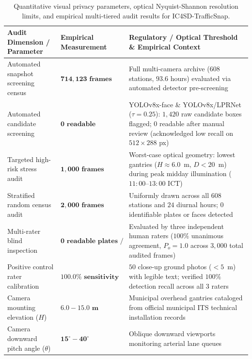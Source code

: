 \begin{table}[!htbp]
\centering
\scriptsize
\setlength{\tabcolsep}{4pt}
\renewcommand{\arraystretch}{1.08}
\caption{Quantitative visual privacy parameters, optical Nyquist-Shannon resolution limits, and empirical multi-tiered audit results for IC4SD-TrafficSnap.}
\label{tab:pii_audit}
\begin{tabularx}{\textwidth}{@{} >{\raggedright\arraybackslash}p{5.2cm} >{\raggedright\arraybackslash}p{3.8cm} >{\raggedright\arraybackslash}X @{}}
\toprule
\textbf{Audit Dimension / Parameter} & \textbf{Empirical Measurement} & \textbf{Regulatory / Optical Threshold \& Empirical Context} \\
\midrule
Automated snapshot screening census & $\mathbf{714,123\text{ frames}}$ & Full multi-camera archive ($608$ stations, $93.6$ hours) evaluated via automated detector pre-screening \\
\addlinespace[1.5pt]
Automated candidate screening & $\mathbf{0\text{ readable candidates}}$ & YOLOv8x-face \& YOLOv8x/LPRNet ($\tau=0.25$): $1,420$ raw candidate boxes flagged; $0$ readable after manual review (acknowledged low recall on $512\times288$ px) \\
\addlinespace[1.5pt]
Targeted high-risk stress audit & $\mathbf{1,000\text{ frames}}$ & Worst-case optical geometry: lowest gantries ($H \approx 6.0$~m, $D < 20$~m) during peak midday illumination ($11:00$--$13:00$ ICT) \\
\addlinespace[1.5pt]
Stratified random census audit & $\mathbf{2,000\text{ frames}}$ & Uniformly drawn across all $608$ stations and $24$ diurnal hours; $0$ identifiable plates or faces detected \\
\addlinespace[1.5pt]
Multi-rater blind inspection & $\mathbf{0\text{ readable plates / faces}}$ & Evaluated by three independent human raters ($100\%$ unanimous agreement, $P_o = 1.0$ across $3,000$ total audited frames) \\
\addlinespace[1.5pt]
Positive control rater calibration & $\mathbf{100.0\%\text{ sensitivity}}$ & $50$ close-up ground photos ($<5$~m) with legible text; verified $100\%$ detection recall across all $3$ raters \\
\addlinespace[1.5pt]
Camera mounting elevation ($H$) & $\mathbf{6.0 - 15.0\text{ m}}$ & Municipal overhead gantries cataloged from official municipal ITS technical installation records \\
\addlinespace[1.5pt]
Camera downward pitch angle ($\theta$) & $\mathbf{15^\circ - 40^\circ}$ & Oblique downward viewports monitoring arterial lane queues \\

\end{tabularx}
\end{table}
